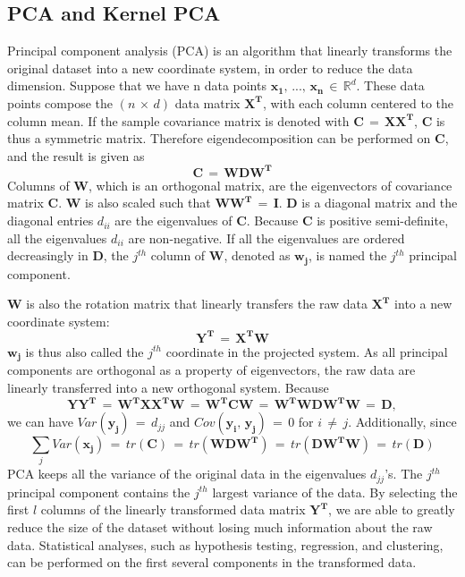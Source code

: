 \documentclass[english]{article}
\numberwithin{equation}{section}
\numberwithin{table}{section}
\numberwithin{figure}{section}
\begin{document}
\subsection{PCA and Kernel PCA} \label{pca}
\hspace{12 pt}
Principal component analysis (PCA) is an algorithm that linearly transforms
the original dataset into a new coordinate system, in order to reduce
the data dimension\cite{linpca}. Suppose that we have n data points $\mathbf{x_{1}},\,...,\,\mathbf{x_{n}}\,\in\,\mathbb{R}^{d}$.
These data points compose the $(n\,\times\, d)$ data matrix $\mathbf{X^{T}}$,
with each column centered to the column mean. If the sample covariance
matrix is denoted with $\mathbf{C}\,=\,\mathbf{XX^{T}}$, $\mathbf{C}$
is thus a symmetric matrix. Therefore eigendecomposition can be performed
on $\mathbf{C}$, and the result is given as
\begin{equation}
\mathbf{C}\,=\,\mathbf{WDW^{T}}
\end{equation}
Columns of $\mathbf{W}$, which is an orthogonal matrix, are the eigenvectors
of covariance matrix $\mathbf{C}$. $\mathbf{W}$ is also scaled such
that $\mathbf{WW^{T}}\,=\,\mathbf{I}$. $\mathbf{D}$ is a diagonal
matrix and the diagonal entries $d_{ii}$ are the eigenvalues of $\mathbf{C}$.
Because $\mathbf{C}$ is positive semi-definite, all the eigenvalues
$d_{ii}$ are non-negative. If all the eigenvalues are ordered decreasingly
in $\mathbf{D}$, the $j^{th}$ column of $\mathbf{W}$, denoted as
$\mathbf{w_{j}}$, is named the $j^{th}$ principal component.

$\mathbf{W}$ is also the rotation matrix that linearly transfers
the raw data $\mathbf{X^{T}}$ into a new coordinate system:
\begin{equation}
\mathbf{Y^{T}}\,=\,\mathbf{X^{T}W}
\end{equation}
$\mathbf{w_{j}}$ is thus also called the $j^{th}$ coordinate in
the projected system. As all principal components are orthogonal as
a property of eigenvectors, the raw data are linearly transferred
into a new orthogonal system. Because 
\begin{equation}
\mathbf{YY^{T}\,=\,\mathbf{W^{T}XX^{T}W}\,=\,\mathbf{W^{T}CW}}\,=\,\mathbf{W^{T}WDW^{T}W}\,=\,\mathbf{D},
\end{equation}
we can have $Var(\mathbf{y_{j}})\,=\, d_{jj}$ and $Cov(\mathbf{y_{i}},\,\mathbf{y_{j}})\,=\,0$
for $i\,\neq\, j$. Additionally, since 
\begin{equation}
\sum_{j}Var(\mathbf{x_{j}})\,=\, tr(\mathbf{C})\,=\, tr(\mathbf{WDW^{T}})\,=\, tr(\mathbf{DW^{T}W})\,=\, tr(\mathbf{D})
\end{equation}
PCA keeps all the variance of the original data in the eigenvalues
$d_{jj}$'s. The $j^{th}$ principal component contains the $j^{th}$
largest variance of the data. By selecting the first $l$ columns
of the linearly transformed data matrix $\mathbf{Y^{T}}$, we are
able to greatly reduce the size of the dataset without losing much
information about the raw data. Statistical analyses, such as hypothesis
testing, regression, and clustering, can be performed on the first
several components in the transformed data.
\end{document}
